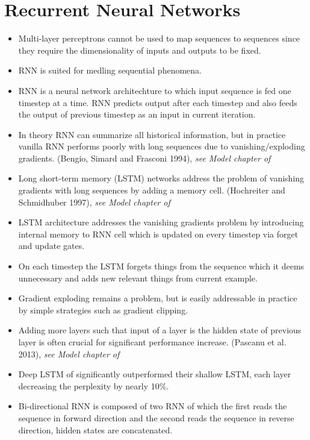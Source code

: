 \documentclass[12pt,a4paper,english
]{tutthesis}
\begin{document}
\section{Recurrent Neural Networks}
\begin{itemize}
\item Multi-layer perceptrons cannot be used to map sequences to sequences since they require the dimensionality of inputs and outputs to be fixed. \cite{Sutskever2014}
\item RNN is suited for medling sequential phenomena. \cite{Kim2016}
\item RNN is a neural network architechture to which input sequence is fed one timestep at a time. RNN predicts output after each timestep and also feeds the output of previous timestep as an input in current iteration.
\item In theory RNN can summarize all historical information, but in practice vanilla RNN performs poorly with long sequences due to vanishing/exploding gradients. (Bengio, Simard and Frasconi 1994), \textit{see Model chapter of \cite{Kim2016}}
\item Long short-term memory (LSTM) networks address the problem of vanishing gradients with long sequences by adding a memory cell. (Hochreiter and Schmidhuber 1997), \textit{see Model chapter of \cite{Kim2016}}
\item LSTM architecture addresses the vanishing gradients problem by introducing internal memory to RNN cell which is updated on every timestep via forget and update gates.
\item On each timestep the LSTM forgets things from the sequence which it deems unnecessary and adds new relevant things from current example.
\item Gradient exploding remains a problem, but is easily addressable in practice by simple strategies such as gradient clipping. \cite{Kim2016}
\item Adding more layers such that input of a layer is the hidden state of previous layer is often crucial for significant performance increase. (Pascanu et al. 2013), \textit{see Model chapter of \cite{Kim2016}}
\item Deep LSTM of \cite{Sutskever2014} significantly outperformed their shallow LSTM, each layer decreasing the perplexity by nearly 10\%.
\item Bi-directional RNN is composed of two RNN of which the first reads the sequence in forward direction and the second reads the sequence in reverse direction, hidden states are concatenated. \cite{Chung2016}
\end{itemize}
\end{document}
